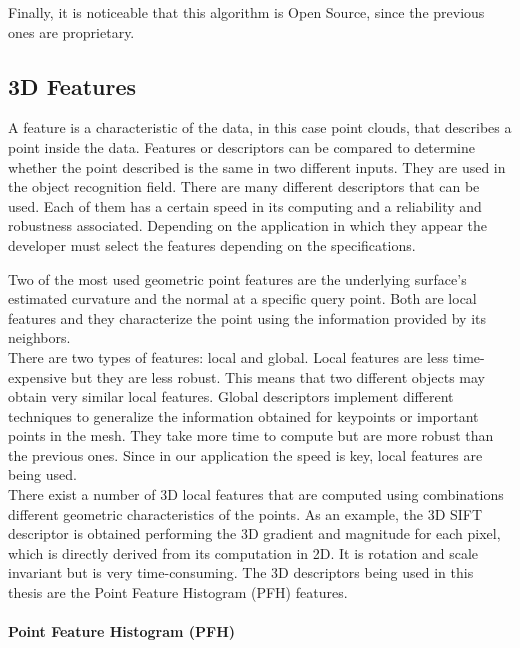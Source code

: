 Finally, it is noticeable that this algorithm is Open Source, since the previous ones are proprietary. 


\subsection{3D Features}
\label{3d_features}


A feature is a characteristic of the data, in this case point clouds, that describes a point inside the data. Features or descriptors can be compared to determine whether the point described is the same in two different inputs. They are used in the object recognition field. 
There are many different descriptors that can be used. Each of them has a certain speed in its computing and a reliability and robustness associated. Depending on the application in which they appear the developer must select the features depending on the specifications. 

Two of the most used geometric point features are the underlying surface's estimated curvature and the normal at a specific query point. Both are local features and they characterize the point using the information provided by its neighbors. \\

There are two types of features: local and global. 
Local features are less time-expensive but they are less robust. 
This means that two different objects may obtain very similar local features.
Global descriptors implement different techniques to generalize the information obtained for keypoints or important points in the mesh. 
They take more time to compute but are more robust than the previous ones. 
Since in our application the speed is key, local features are being used. 
\\

There exist a number of 3D local features that are computed using combinations different geometric characteristics of the points. 
As an example, the 3D SIFT descriptor \cite{Scovanner2007} is obtained performing the 3D gradient and magnitude for each pixel, which is directly derived from its computation in 2D. 
It is rotation and scale invariant but is very time-consuming. 
The 3D descriptors being used in this thesis are the Point Feature Histogram (PFH) features. 

\paragraph{Point Feature Histogram (PFH)}\mbox{}
\label{pfh}

